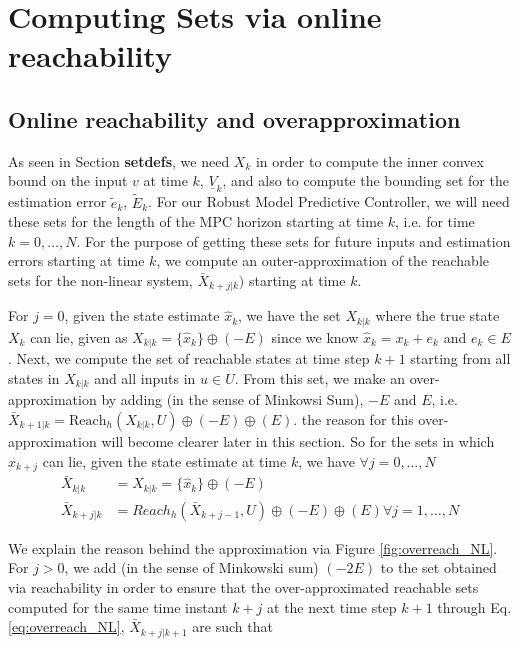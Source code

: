 \section{Computing Sets via online reachability}

\subsection{Online reachability and overapproximation}

As seen in Section \textbf{setdefs}, we need $X_{k}$ in order to compute the inner convex bound on the input $v$ at time $k$, $\underline{V}_k$, and also to compute the bounding set for the estimation error $\tilde{e}_k$, $\tilde{E}_k$. For our Robust Model Predictive Controller, we will need these sets for the length of the MPC horizon starting at time $k$, i.e. for time $k=0,\dotsc,N$. For the purpose of getting these sets for future inputs and estimation errors starting at time $k$, we compute an outer-approximation of the reachable sets for the non-linear system,  $\bar{X}_{k+j|k})$ starting at time $k$.

For $j=0$, given the state estimate $\hat{x}_k$,  we have the set ${X}_{k|k}$ where the true state $X_k$ can lie, given as $X_{k|k} = \lbrace \hat{x}_k \rbrace \oplus (-E)$ since we know $\hat{x}_k = x_k + e_k$ and $e_k \in E$. Next, we compute the set of reachable states at time step $k+1$ starting from all states in ${X}_{k|k}$ and all inputs in $u \in U$. From this set, we make an over-approximation by adding (in the sense of Minkowsi Sum), $-E$ and $E$,  i.e. $\bar{X}_{k+1|k} = \text{Reach}_h(X_{k|k},U)\oplus(-E) \oplus(E)$. the reason for this over-approximation will become clearer later in this section. So for the sets in which $x_{k+j}$ can lie, given the state estimate at time $k$, we have $\forall j=0,\dotsc,N$
\begin{subequations}
\label{eq:overreach_NL}
\begin{align}
\bar{X}_{k|k}&=X_{k|k}=\lbrace\hat{x}_k\rbrace \oplus (-E) \\
\bar{X}_{k+j|k}&=Reach_h(\bar{X}_{k+j-1},U) \oplus (-E) \oplus (E) \forall j=1,\dotsc,N
\end{align}
\end{subequations}

We explain the reason behind the approximation via Figure \ref{fig:overreach_NL}. For $j>0$, we add (in the sense of Minkowski sum) $(-2E)$ to the set obtained via reachability in order to ensure that the over-approximated reachable sets computed for the same time instant $k+j$ at the next time step $k+1$ through Eq. \ref{eq:overreach_NL}, $\bar{X}_{k+j|k+1}$ are such that 

